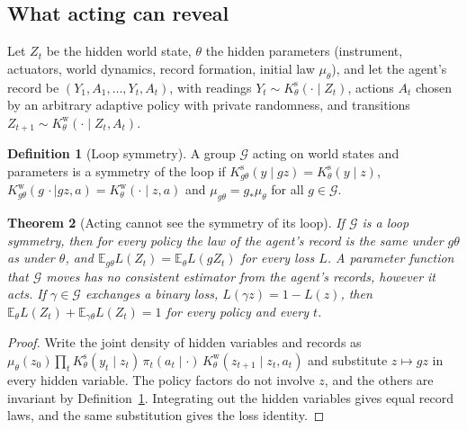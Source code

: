 \documentclass[12pt]{article}
\newtheorem{theorem}{Theorem}
\theoremstyle{definition}
\newtheorem{definition}[theorem]{Definition}
\newcommand{\E}{\mathbb E}
\begin{document}
\subsection{What acting can reveal}
\label{subsec:J_gauge}

Let $Z_t$ be the hidden world state, $\theta$ the hidden parameters (instrument, actuators, world dynamics, record formation, initial law $\mu_\theta$), and let the agent's record be $(Y_1,A_1,\dots,Y_t,A_t)$, with readings $Y_t\sim K^{\mathrm s}_\theta(\cdot\mid Z_t)$, actions $A_t$ chosen by an arbitrary adaptive policy with private randomness, and transitions $Z_{t+1}\sim K^{\mathrm w}_\theta(\cdot\mid Z_t,A_t)$.

\begin{definition}[Loop symmetry]
\label{def:loopsym}
A group $\mathcal G$ acting on world states and parameters is a symmetry of the loop if $K^{\mathrm s}_{g\theta}(y\mid gz)=K^{\mathrm s}_\theta(y\mid z)$, $K^{\mathrm w}_{g\theta}(g\,\cdot\mid gz,a)=K^{\mathrm w}_\theta(\cdot\mid z,a)$ and $\mu_{g\theta}=g_*\mu_\theta$ for all $g\in\mathcal G$.
\end{definition}

\begin{theorem}[Acting cannot see the symmetry of its loop]
\label{thm:gauge}
If $\mathcal G$ is a loop symmetry, then for every policy the law of the agent's record is the same under $g\theta$ as under $\theta$, and $\E_{g\theta}L(Z_t)=\E_\theta L(gZ_t)$ for every loss $L$. A parameter function that $\mathcal G$ moves has no consistent estimator from the agent's records, however it acts. If $\gamma\in\mathcal G$ exchanges a binary loss, $L(\gamma z)=1-L(z)$, then $\E_\theta L(Z_t)+\E_{\gamma\theta}L(Z_t)=1$ for every policy and every $t$.
\end{theorem}

\begin{proof}
Write the joint density of hidden variables and records as $\mu_\theta(z_0)\prod_tK^{\mathrm s}_\theta(y_t\mid z_t)\,\pi_t(a_t\mid\cdot)\,K^{\mathrm w}_\theta(z_{t+1}\mid z_t,a_t)$ and substitute $z\mapsto gz$ in every hidden variable. The policy factors do not involve $z$, and the others are invariant by Definition~\ref{def:loopsym}. Integrating out the hidden variables gives equal record laws, and the same substitution gives the loss identity.
\end{proof}
\end{document}
